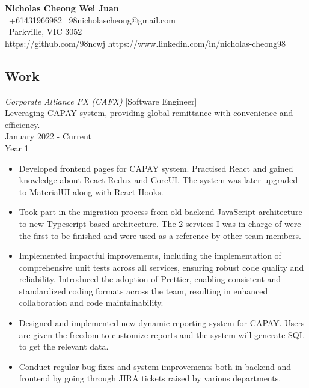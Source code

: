 \documentclass[10pt, a4paper]{cv}
\begin{document}
\noindent
{\LARGE \textbf{Nicholas Cheong Wei Juan}} \\
\noindent
\faPhone\ +61431966982 \hspace{25pt}
\faEnvelope\ 98nicholascheong@gmail.com  \\
\faHome\ Parkville, VIC 3052 \\
 https://github.com/98ncwj \hspace{25pt}
\faLinkedinSquare \space https://www.linkedin.com/in/nicholas-cheong98


\begin{paracol}{2}
	\begin{flushleft}

		\section*{Work}
		 {\sl Corporate Alliance FX (CAFX) } [Software Engineer] \\
		Leveraging CAPAY system, providing global remittance with convenience and efficiency.\\
		January 2022 - Current \\
		\vspace{6pt}
		\quad Year 1
		\begin{itemize}[ topsep=0pt] \itemsep -2pt
			\item Developed frontend pages for CAPAY system. Practised React and gained knowledge about React Redux and CoreUI. The system was later upgraded to MaterialUI along with React Hooks.
			\item Took part in the migration process from old backend JavaScript architecture to new Typescript based architecture. The 2 services I was in charge of were the first to be finished and were used as a reference by other team members.
			\item Implemented impactful improvements, including the implementation of comprehensive unit tests across all services, ensuring robust code quality and reliability. Introduced the adoption of Prettier, enabling consistent and standardized coding formats across the team, resulting in enhanced collaboration and code maintainability.
			\item Designed and implemented new dynamic reporting system for CAPAY. Users are given the freedom to customize reports and the system will generate SQL to get the relevant data.
			\item Conduct regular bug-fixes and system improvements both in backend and frontend by going through JIRA tickets raised by various departments.

\end{itemize}
\end{flushleft}
\end{paracol}
\end{document}
